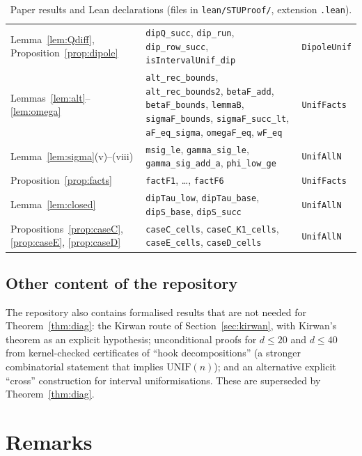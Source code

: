 \documentclass[11pt]{amsart}
\theoremstyle{definition}
\theoremstyle{remark}
\numberwithin{equation}{section}
\newcommand{\lean}[1]{\texttt{#1}}
\begin{document}
\begin{table}[ht]
\begin{tabular}{p{}p{}p{}}
Lemma~\ref{lem:Qdiff}, Proposition~\ref{prop:dipole} & \lean{dipQ\_succ}, \lean{dip\_run}, \lean{dip\_row\_succ}, \lean{isIntervalUnif\_dip} & \lean{DipoleUnif}\\
Lemmas~\ref{lem:alt}--\ref{lem:omega} & \lean{alt\_rec\_bounds}, \lean{alt\_rec\_bounds2}, \lean{betaF\_add}, \lean{betaF\_bounds}, \lean{lemmaB}, \lean{sigmaF\_bounds}, \lean{sigmaF\_succ\_lt}, \lean{aF\_eq\_sigma}, \lean{omegaF\_eq}, \lean{wF\_eq} & \lean{UnifFacts}\\
Lemma~\ref{lem:sigma}(v)--(viii) & \lean{msig\_le}, \lean{gamma\_sig\_le}, \lean{gamma\_sig\_add\_a}, \lean{phi\_low\_ge} & \lean{UnifAllN}\\
Proposition~\ref{prop:facts} & \lean{factF1}, \dots, \lean{factF6} & \lean{UnifFacts}\\
Lemma~\ref{lem:closed} & \lean{dipTau\_low}, \lean{dipTau\_base}, \lean{dipS\_base}, \lean{dipS\_succ} & \lean{UnifAllN}\\
Propositions~\ref{prop:caseC}, \ref{prop:caseE}, \ref{prop:caseD} & \lean{caseC\_cells}, \lean{caseC\_K1\_cells}, \lean{caseE\_cells}, \lean{caseD\_cells} & \lean{UnifAllN}\\
\bottomrule
\end{tabular}
\caption{Paper results and Lean declarations (files in \lean{lean/STUProof/}, extension \lean{.lean}).}
\label{tab:lean}
\end{table}

\subsection{Other content of the repository}
The repository also contains formalised results that are not needed for Theorem~\ref{thm:diag}: the
Kirwan route of Section~\ref{sec:kirwan}, with Kirwan's theorem as an explicit hypothesis; unconditional
proofs for $d\le20$ and $d\le40$ from kernel-checked certificates of ``hook decompositions'' (a stronger
combinatorial statement that implies $\mathrm{UNIF}(n)$); and an alternative explicit ``cross''
construction for interval uniformisations. These are superseded by Theorem~\ref{thm:diag}.

\section{Remarks}\label{sec:remarks}
\end{document}
